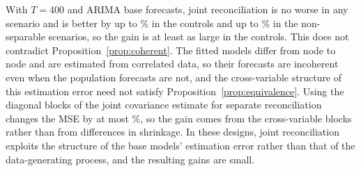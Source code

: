 With $T = 400$ and ARIMA base forecasts, joint reconciliation is no worse in any scenario and is better by up to \expTwoCtrlGainMax\% in the controls and up to \expTwoNonsepGainMax\% in the non-separable scenarios, so the gain is at least as large in the controls. This does not contradict Proposition~\ref{prop:coherent}. The fitted models differ from node to node and are estimated from correlated data, so their forecasts are incoherent even when the population forecasts are not, and the cross-variable structure of this estimation error need not satisfy Proposition~\ref{prop:equivalence}. Using the diagonal blocks of the joint covariance estimate for separate reconciliation changes the MSE by at most \expTwoBlocksMaxDiff\%, so the gain comes from the cross-variable blocks rather than from differences in shrinkage. In these designs, joint reconciliation exploits the structure of the base models' estimation error rather than that of the data-generating process, and the resulting gains are small.


